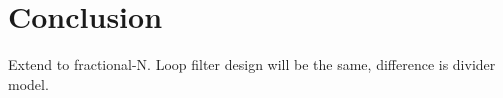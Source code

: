 \documentclass[10pt,a4paper]{article}
\makeatletter
\def \lineheight {1.5pt}
\def\vhrulefill#1{\leavevmode\leaders\hrule\@height#1\hfill \kern\z@}
\makeatother
\begin{document}

	\fontfamily{\sfdefault}\selectfont 
	\thispagestyle{nohdr}
	\null\pagebreak
	\thispagestyle{nohdr}
	\null\pagebreak
	\tableofcontents
	\pagebreak
	\listoffigures
	\listoftables


	\fontfamily{\rmdefault}\selectfont 
	

	\pagebreak
	\FloatBarrier
	
	\pagebreak
	\FloatBarrier
	
	

	


    

    \FloatBarrier
    \section{Conclusion} \label{conclusion}
    Extend to fractional-N. Loop filter design will be the same, difference is divider model.


\end{document}

